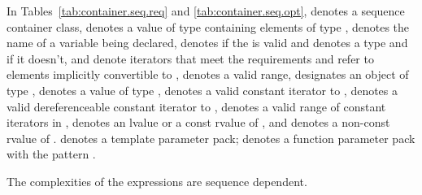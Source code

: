 \pnum
In Tables~\ref{tab:container.seq.req}
and \ref{tab:container.seq.opt},
 denotes a sequence container class,
 denotes a value of type  containing elements of type ,
 denotes the name of a variable being declared,
 denotes  if
the   is valid and denotes a
type and
 if it doesn't,
 and 
denote iterators that meet the  requirements
and refer to elements implicitly convertible to ,
\tcode{[i, j)}
denotes a valid range,
 designates an object of type ,
denotes a value of type ,
 denotes a valid constant iterator to
, 
denotes a valid dereferenceable constant iterator to
, \tcode{[q1, q2)}
denotes a valid range of constant iterators in
, 
denotes an lvalue or a const rvalue of
, and  denotes
a non-const rvalue of .
 denotes a template parameter pack;
 denotes a function parameter pack with the pattern .

\pnum
The complexities of the expressions are sequence dependent.

